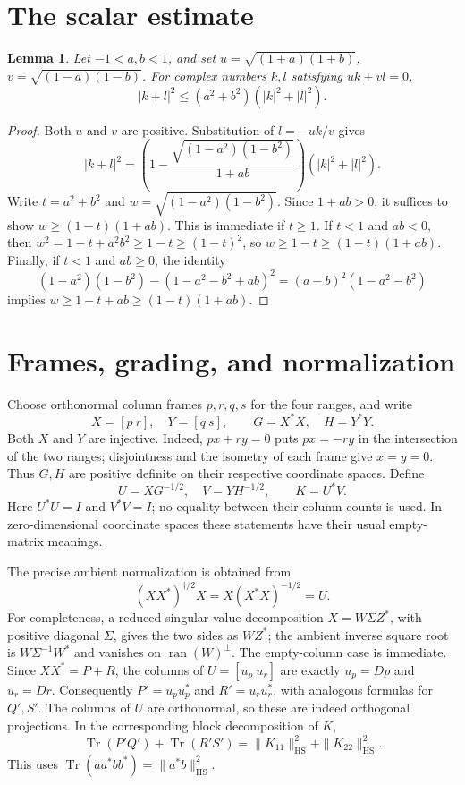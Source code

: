 \documentclass[11pt]{article}
\newtheorem{lemma}[theorem]{Lemma}
\DeclareMathOperator{\Tr}{Tr}
\DeclareMathOperator{\ran}{ran}
\newcommand{\HS}{\mathrm{HS}}
\begin{document}
\section{The scalar estimate}
\begin{lemma}\label{lem:scalar}
Let $-1<a,b<1$, and set
$u=\sqrt{(1+a)(1+b)}$, $v=\sqrt{(1-a)(1-b)}$.
For complex numbers $k,l$ satisfying $uk+vl=0$,
\begin{equation}\label{eq:scalar}
 |k+l|^2\leq(a^2+b^2)(|k|^2+|l|^2).
\end{equation}
\end{lemma}
\begin{proof}
Both $u$ and $v$ are positive. Substitution of $l=-uk/v$ gives
\[
 |k+l|^2=
 \left(1-\frac{\sqrt{(1-a^2)(1-b^2)}}{1+ab}\right)
 (|k|^2+|l|^2).
\]
Write $t=a^2+b^2$ and $w=\sqrt{(1-a^2)(1-b^2)}$.
Since $1+ab>0$, it suffices to show $w\geq(1-t)(1+ab)$.
This is immediate if $t\geq1$. If $t<1$ and $ab<0$, then
$w^2=1-t+a^2b^2\geq1-t\geq(1-t)^2$, so
$w\geq1-t\geq(1-t)(1+ab)$. Finally, if $t<1$ and $ab\geq0$, the identity
\[
 (1-a^2)(1-b^2)-(1-a^2-b^2+ab)^2
  =(a-b)^2(1-a^2-b^2)
\]
implies $w\geq1-t+ab\geq(1-t)(1+ab)$.
\end{proof}

\section{Frames, grading, and normalization}
Choose orthonormal column frames $p,r,q,s$ for the four ranges, and write
\[
 X=[p\ r],\quad Y=[q\ s],\qquad G=X^*X,\quad H=Y^*Y.
\]
Both $X$ and $Y$ are injective. Indeed, $px+ry=0$ puts $px=-ry$ in the
intersection of the two ranges; disjointness and the isometry of each frame
give $x=y=0$. Thus $G,H$ are positive definite on their respective coordinate
spaces. Define
\[
 U=XG^{-1/2},\quad V=YH^{-1/2},\qquad K=U^*V.
\]
Here $U^*U=I$ and $V^*V=I$; no equality between their column counts is used.
In zero-dimensional coordinate spaces these statements have their usual
empty-matrix meanings.

The precise ambient normalization is obtained from
\begin{equation}\label{eq:polar}
 (XX^*)^{\dagger/2}X=X(X^*X)^{-1/2}=U.
\end{equation}
For completeness, a reduced singular-value decomposition $X=W\Sigma Z^*$,
with positive diagonal $\Sigma$, gives the two sides as $WZ^*$; the
ambient inverse square root is $W\Sigma^{-1}W^*$ and vanishes on
$\ran(W)^\perp$. The empty-column case is immediate.
Since $XX^*=P+R$, the columns of $U=[u_p\ u_r]$ are exactly
$u_p=Dp$ and $u_r=Dr$. Consequently
$P'=u_pu_p^*$ and $R'=u_ru_r^*$, with analogous formulas for $Q',S'$.
The columns of $U$ are orthonormal, so these are indeed orthogonal
projections. In the corresponding block decomposition of $K$,
\begin{equation}\label{eq:pinching}
 \Tr(P'Q')+\Tr(R'S')
 =\|K_{11}\|_{\HS}^2+\|K_{22}\|_{\HS}^2.
\end{equation}
This uses $\Tr(aa^*bb^*)=\|a^*b\|_{\HS}^2$.
\end{document}
